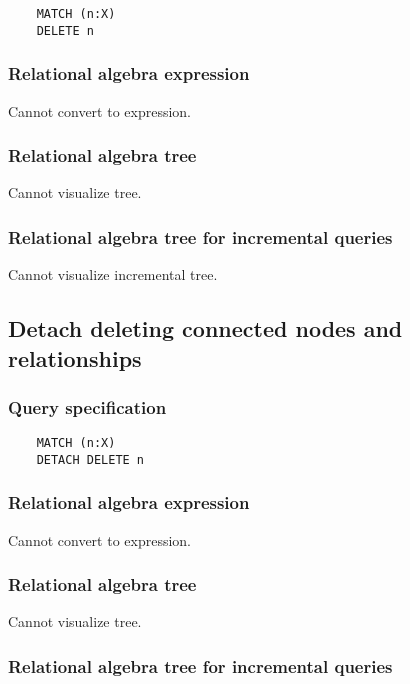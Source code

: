 	\begin{lstlisting}
	MATCH (n:X)
	DELETE n
	\end{lstlisting}


	\subsubsection*{Relational algebra expression}

	Cannot convert to expression.

	\subsubsection*{Relational algebra tree}

	Cannot visualize tree.

	\subsubsection*{Relational algebra tree for incremental queries}

	Cannot visualize incremental tree.
	\subsection{Detach deleting connected nodes and relationships}

	\subsubsection*{Query specification}

	\begin{lstlisting}
	MATCH (n:X)
	DETACH DELETE n
	\end{lstlisting}


	\subsubsection*{Relational algebra expression}

	Cannot convert to expression.

	\subsubsection*{Relational algebra tree}

	Cannot visualize tree.

	\subsubsection*{Relational algebra tree for incremental queries}

